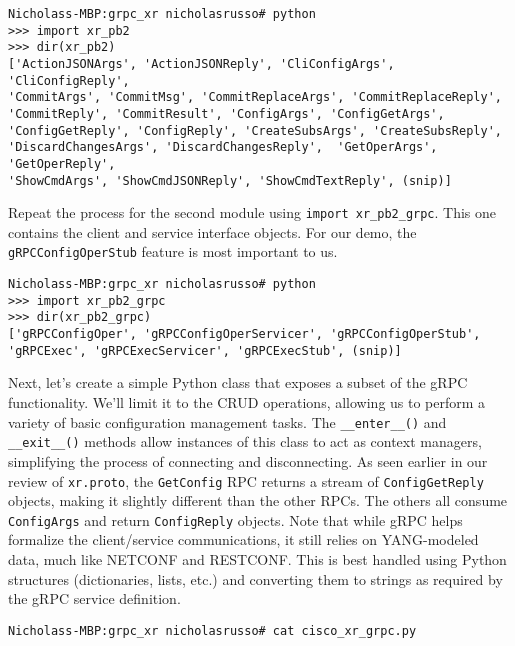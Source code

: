 \begin{verbatim}
Nicholass-MBP:grpc_xr nicholasrusso# python
>>> import xr_pb2
>>> dir(xr_pb2)
['ActionJSONArgs', 'ActionJSONReply', 'CliConfigArgs', 'CliConfigReply',
'CommitArgs', 'CommitMsg', 'CommitReplaceArgs', 'CommitReplaceReply',
'CommitReply', 'CommitResult', 'ConfigArgs', 'ConfigGetArgs',
'ConfigGetReply', 'ConfigReply', 'CreateSubsArgs', 'CreateSubsReply',
'DiscardChangesArgs', 'DiscardChangesReply',  'GetOperArgs', 'GetOperReply',
'ShowCmdArgs', 'ShowCmdJSONReply', 'ShowCmdTextReply', (snip)]
\end{verbatim}

Repeat the process for the second module using \verb|import xr_pb2_grpc|.
This one contains the client and service interface objects. For our demo,
the \verb|gRPCConfigOperStub| feature is most important to us.

\begin{verbatim}
Nicholass-MBP:grpc_xr nicholasrusso# python
>>> import xr_pb2_grpc
>>> dir(xr_pb2_grpc)
['gRPCConfigOper', 'gRPCConfigOperServicer', 'gRPCConfigOperStub',
'gRPCExec', 'gRPCExecServicer', 'gRPCExecStub', (snip)]
\end{verbatim}

Next, let's create a simple Python class that exposes a subset of the
gRPC functionality. We'll limit it to the CRUD operations, allowing
us to perform a variety of basic configuration management tasks. The
\verb|__enter__()| and \verb|__exit__()| methods allow instances of this
class to act as context managers, simplifying the process of connecting
and disconnecting. As seen earlier in our review of \verb|xr.proto|,
the \verb|GetConfig| RPC returns a stream of \verb|ConfigGetReply|
objects, making it slightly different than the other RPCs. The others
all consume \verb|ConfigArgs| and return \verb|ConfigReply| objects.
Note that while gRPC helps formalize the client/service communications,
it still relies on YANG-modeled data, much like NETCONF and RESTCONF\@.
This is best handled using Python structures (dictionaries, lists, etc.)
and converting them to strings as required by the gRPC service definition.

\begin{verbatim}
Nicholass-MBP:grpc_xr nicholasrusso# cat cisco_xr_grpc.py
\end{verbatim}

